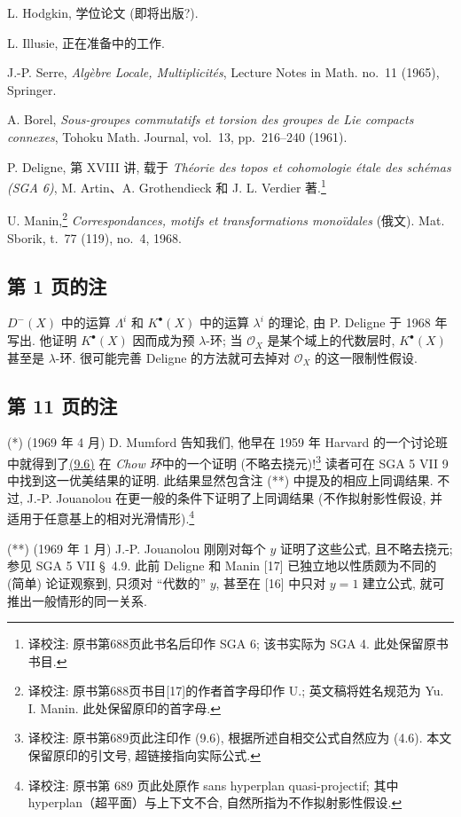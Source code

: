 \begin{enumerate}[label={[\arabic*]},leftmargin=3.2em]
\item L. Hodgkin, 学位论文 (即将出版?).

\item L. Illusie, 正在准备中的工作.

\item J.-P. Serre, \emph{Alg\`ebre Locale, Multiplicit\'es},
  Lecture Notes in Math. no.~11 (1965), Springer.

\item A. Borel,
  \emph{Sous-groupes commutatifs et torsion des groupes de Lie compacts
  connexes}, Tohoku Math. Journal, vol.~13, pp.~216--240 (1961).

\item[{[16]}(*)] P. Deligne, 第 XVIII 讲, 载于
  \emph{Th\'eorie des topos et cohomologie \'etale des sch\'emas (SGA 6)},
  M. Artin、A. Grothendieck 和 J. L. Verdier 著.\footnote{译校注: 原书第688页此书名后印作 SGA 6; 该书实际为 SGA 4. 此处保留原书书目.}

\item[{[17]}(*)] U. Manin,\footnote{译校注: 原书第688页书目[17]的作者首字母印作 U.; 英文稿将姓名规范为 Yu. I. Manin. 此处保留原印的首字母.}
  \emph{Correspondances, motifs et transformations mono\"idales}
  (俄文). Mat. Sborik, t.~77 (119), no.~4, 1968.
\end{enumerate}


\subsection*{第 1 页的注}

$D^{-}(X)$ 中的运算 $\Lambda^i$ 和 $K^\bullet(X)$ 中的运算 $\lambda^i$ 的理论, 由 P. Deligne 于 1968 年写出. 他证明 $K^\bullet(X)$ 因而成为预 $\lambda$-环; 当 $\mathcal O_X$ 是某个域上的代数层时, $K^\bullet(X)$ 甚至是 $\lambda$-环. 很可能完善 Deligne 的方法就可去掉对 $\mathcal O_X$ 的这一限制性假设.

\subsection*{第 11 页的注}

\noindent(*) (1969 年 4 月) D. Mumford 告知我们, 他早在 1959 年 Harvard 的一个讨论班中就得到了\hyperlink{sga6.e14.eq.4-6}{(9.6)} 在 \emph{Chow 环}中的一个证明 (不略去挠元)!\footnote{译校注: 原书第689页此注印作 (9.6), 根据所述自相交公式自然应为 (4.6). 本文保留原印的引文号, 超链接指向实际公式.} 读者可在 SGA 5 VII 9 中找到这一优美结果的证明. 此结果显然包含注 (**) 中提及的相应上同调结果. 不过, J.-P. Jouanolou 在更一般的条件下证明了上同调结果 (不作拟射影性假设, 并适用于任意基上的相对光滑情形).\footnote{译校注: 原书第 689 页此处原作 sans hyperplan quasi-projectif; 其中 hyperplan（超平面）与上下文不合, 自然所指为不作拟射影性假设.}

\medskip

\noindent(**) (1969 年 1 月) J.-P. Jouanolou 刚刚对每个 $y$ 证明了这些公式, 且不略去挠元; 参见 SGA 5 VII \S~4.9. 此前 Deligne 和 Manin [17] 已独立地以性质颇为不同的 (简单) 论证观察到, 只须对 ``代数的'' $y$, 甚至在 [16] 中只对 $y=1$ 建立公式, 就可推出一般情形的同一关系.

\SGAArchiveOnly{}

